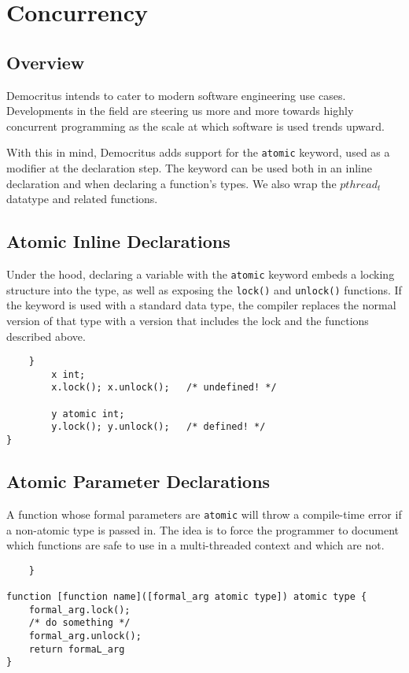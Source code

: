\chapter{Concurrency}
	\section{Overview}
		Democritus intends to cater to modern software engineering use cases. Developments in the field are steering us more and more towards highly concurrent programming as the scale at which software is used trends upward.

		\vspace{5mm}
		\noindent
		With this in mind, Democritus adds support for the \texttt{atomic} keyword, used as a modifier at the declaration step. The keyword can be used both in an inline declaration and when declaring a function's types. We also wrap the \texttt{$pthread_t$} datatype and related functions.

	\section{Atomic Inline Declarations}
		Under the hood, declaring a variable with the \texttt{atomic} keyword embeds a locking structure into the type, as well as exposing the \texttt{lock()} and \texttt{unlock()} functions. If the keyword is used with a standard data type, the compiler replaces the normal version of that type with a version that includes the lock and the functions described above.

		\begin{lstlisting}
	}
		x int;
		x.lock(); x.unlock();	/* undefined! */

		y atomic int;
		y.lock(); y.unlock();	/* defined! */
}
		\end{lstlisting}

	\section{Atomic Parameter Declarations}
		A function whose formal parameters are \texttt{atomic} will throw a compile-time error if a non-atomic type is passed in. The idea is to force the programmer to document which functions are safe to use in a multi-threaded context and which are not.

		\begin{lstlisting}
	}
	
function [function name]([formal_arg atomic type]) atomic type {
	formal_arg.lock();
	/* do something */
	formal_arg.unlock();
	return formaL_arg
}
		\end{lstlisting}

